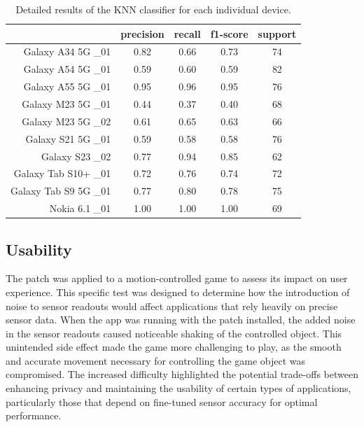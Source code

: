 \documentclass[11pt,
  oneside,openany,    %
]{scrreprt}
\begin{document}
\begin{table}[h]
  \centering
  \captionsetup{justification=centering}
  \begin{tabular}{r|cccc|}
                        & precision & recall  & f1-score  & support \\ \hline
    Galaxy A34 5G \_01  & 0.82      & 0.66    & 0.73      & 74      \\
    Galaxy A54 5G \_01  & 0.59      & 0.60    & 0.59      & 82      \\
    Galaxy A55 5G \_01  & 0.95      & 0.96    & 0.95      & 76      \\
    Galaxy M23 5G \_01  & 0.44      & 0.37    & 0.40      & 68      \\
    Galaxy M23 5G \_02  & 0.61      & 0.65    & 0.63      & 66      \\
    Galaxy S21 5G \_01  & 0.59      & 0.58    & 0.58      & 76      \\
       Galaxy S23 \_02  & 0.77      & 0.94    & 0.85      & 62      \\
  Galaxy Tab S10+ \_01  & 0.72      & 0.76    & 0.74      & 72      \\
 Galaxy Tab S9 5G \_01  & 0.77      & 0.80    & 0.78      & 75      \\
        Nokia 6.1 \_01  & 1.00      & 1.00    & 1.00      & 69      \\
  \end{tabular}
  \caption{Detailed results of the KNN classifier for each individual device.}
  \label{tab:knn_detailed_results}
\end{table}

\subsection{Usability}
\label{subsec:usability}
The patch was applied to a motion-controlled game \cite{krassesSpiel} to assess its impact on user experience.
This specific test was designed to determine how the introduction of noise to sensor readouts would affect applications that rely heavily on precise sensor data.
When the app was running with the patch installed, the added noise in the sensor readouts caused noticeable shaking of the controlled object.
This unintended side effect made the game more challenging to play, as the smooth and accurate movement necessary for controlling the game object was compromised.
The increased difficulty highlighted the potential trade-offs between enhancing privacy and maintaining the usability of certain types of applications, particularly those that depend on fine-tuned sensor accuracy for optimal performance.
\end{document}
